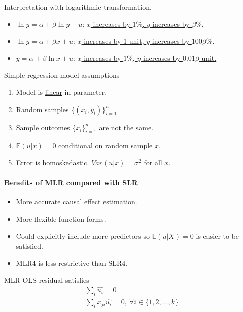 \documentclass[]{article}
\begin{document}
	\begin{proposition}[Logarithms] Interpretation with logarithmic transformation.
	    \begin{itemize}
	        \item $\ln{y} = \alpha + \beta \ln{y} + u$: \ul{$x$ increases by $1\%$, $y$ increases by $\beta \%$}.
	        \item $\ln{y} = \alpha + \beta x + u$: \ul{$x$ increases by 1 unit, $y$ increases by $100 \beta \%$}.
	        \item $y = \alpha + \beta \ln{x} + u$: \ul{$x$ increases by $1\%$, $y$ increases by $0.01\beta$ unit.}
	    \end{itemize}
	\end{proposition}
	
	\begin{assumption}
	    Simple regression model assumptions
	    \begin{enumerate}
	        \item Model is \ul{linear} in parameter.
	        \item \ul{Random samples} $\{(x_i, y_i)\}_{i=1}^n$.
	        \item Sample outcomes $\{x_i\}_{i=1}^n$ are not the same.
	        \item $\mathbb{E}(u|x)=0$ conditional on random sample $x$.
	        \item Error is \ul{homoskedastic}. $Var(u|x) = \sigma^2$ for all $x$.
	    \end{enumerate}
	\end{assumption}
	\paragraph{Benefits of MLR compared with SLR}
	    \begin{itemize}
	        \item More accurate causal effect estimation.
	        \item More flexible function forms.
	        \item Could explicitly include more predictors so $\mathbb{E}(u|X) = 0$ is easier to be satisfied.
	        \item MLR4 is less restrictive than SLR4.
	    \end{itemize}
	   
    \begin{property}
        MLR OLS residual satisfies
        \begin{gather*}
            \sum_i {\hat{u_i}} = 0\\
            \sum_i {x_{ji} \hat{u_i}} = 0,\ \forall i \in \{1, 2, \dots, k\}
        \end{gather*}
    \end{property}
    
\end{document}
